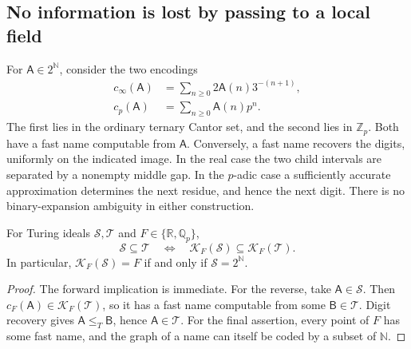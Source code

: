 \documentclass[11pt]{article}
\theoremstyle{definition}
\theoremstyle{remark}
\newcommand{\R}{\mathbb{R}}
\newcommand{\N}{\mathbb{N}}
\newcommand{\Qp}{\mathbb{Q}_p}
\newcommand{\Zp}{\mathbb{Z}_p}
\begin{document}
\subsection{No information is lost by passing to a local field}
For $\mathsf A\in2^\N$, consider the two encodings
\begin{align}
 c_\infty(\mathsf A)&=\sum_{n\geq0}2\mathsf A(n)3^{-(n+1)},\label{isg:ptg:eq:cantorcode}\\
 c_p(\mathsf A)&=\sum_{n\geq0}\mathsf A(n)p^n.\label{isg:ptg:eq:pcode}
\end{align}
The first lies in the ordinary ternary Cantor set, and the second lies in
$\Zp$. Both have a fast name computable from $\mathsf A$. Conversely, a fast
name recovers the digits, uniformly on the indicated image. In the real
case the two child intervals are separated by a nonempty middle gap. In the
$p$-adic case a sufficiently accurate approximation determines the next
residue, and hence the next digit. There is no binary-expansion ambiguity
in either construction.

\begin{proposition}\label{isg:ptg:prop:faithful}
For Turing ideals $\mathcal S,\mathcal T$ and $F\in\{\R,\Qp\}$,
\[
 \mathcal S\subseteq\mathcal T\quad\Longleftrightarrow\quad
 \mathcal K_F(\mathcal S)\subseteq\mathcal K_F(\mathcal T).
\]
In particular, $\mathcal K_F(\mathcal S)=F$ if and only if
$\mathcal S=2^\N$.
\end{proposition}
\begin{proof}
The forward implication is immediate. For the reverse, take
$\mathsf A\in\mathcal S$. Then $c_F(\mathsf A)\in\mathcal K_F(\mathcal T)$,
so it has a fast name computable from some $\mathsf B\in\mathcal T$. Digit
recovery gives $\mathsf A\leq_T\mathsf B$, hence $\mathsf A\in\mathcal T$.
For the final assertion, every point of $F$ has some fast name, and the
graph of a name can itself be coded by a subset of $\N$.
\end{proof}
\end{document}
